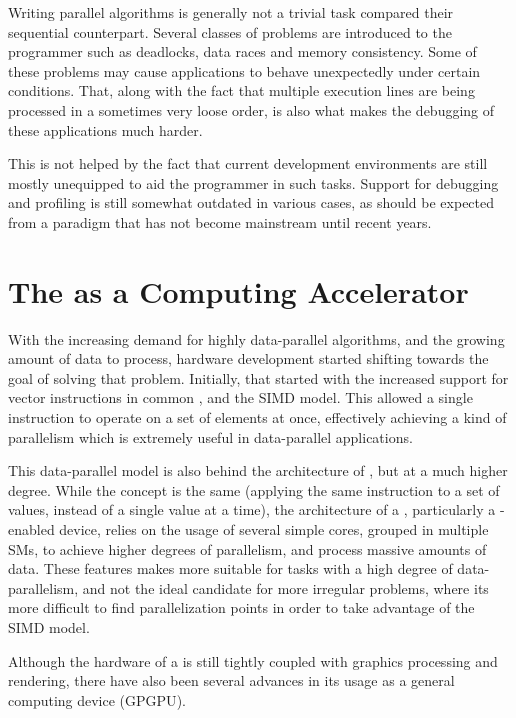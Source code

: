 \documentclass[main.tex]{subfiles}
\begin{document}
Writing parallel algorithms is generally not a trivial task compared their sequential counterpart. Several classes of problems are introduced to the programmer such as deadlocks, data races and memory consistency. Some of these problems may cause applications to behave unexpectedly under certain conditions. That, along with the fact that multiple execution lines are being processed in a sometimes very loose order, is also what makes the debugging of these applications much harder.

This is not helped by the fact that current development environments are still mostly unequipped to aid the programmer in such tasks. Support for debugging and profiling is still somewhat outdated in various cases, as should be expected from a paradigm that has not become mainstream until recent years.


\section{The \gpu as a Computing Accelerator}

With the increasing demand for highly data-parallel algorithms, and the growing amount of data to process, hardware development started shifting towards the goal of solving that problem. Initially, that started with the increased support for vector instructions in common \cpus, and the \acs{SIMD} model. This allowed a single instruction to operate on a set of elements at once, effectively achieving a kind of parallelism which is extremely useful in data-parallel applications.

This data-parallel model is also behind the architecture of \gpus, but at a much higher degree. While the concept is the same (applying the same instruction to a set of values, instead of a single value at a time), the architecture of a \gpu, particularly a \cuda-enabled device, relies on the usage of several simple cores, grouped in multiple \aclp{SM}, to achieve higher degrees of parallelism, and process massive amounts of data.
These features makes \gpus more suitable for tasks with a high degree of data-parallelism, and not the ideal candidate for more irregular problems, where its more difficult to find parallelization points in order to take advantage of the \acs{SIMD} model.

Although the hardware of a \gpu is still tightly coupled with graphics processing and rendering, there have also been several advances in its usage as a general computing device (\acs{GPGPU}).
\end{document}
